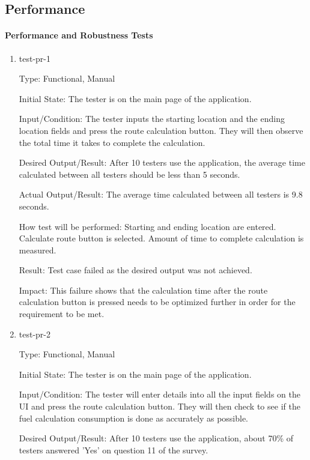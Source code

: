 \documentclass[12pt, titlepage]{article}
\begin{document}
\subsection{Performance}

\paragraph{Performance and Robustness Tests}

\begin{enumerate}

\item{test-pr-1\\}

Type: Functional, Manual

Initial State: The tester is on the main page of the application.

Input/Condition: The tester inputs the starting location and the ending location fields and press the route calculation button. They will then observe the total time it takes to complete the calculation.

Desired Output/Result: After 10 testers use the application, the average time calculated between all testers should be less than 5 seconds.

Actual Output/Result: The average time calculated between all testers is 9.8 seconds.

How test will be performed: Starting and ending location are entered. Calculate route button is selected. Amount of time to complete calculation is measured. 

Result: Test case failed as the desired output was not achieved.

Impact: This failure shows that the calculation time after the route calculation button is pressed needs to be optimized further in order for the requirement to be met.

\item{test-pr-2\\}

Type: Functional, Manual

Initial State: The tester is on the main page of the application.

Input/Condition: The tester will enter details into all the input fields on the UI and press the route calculation button. They will then check to see if the fuel calculation consumption is done as accurately as possible.

Desired Output/Result: After 10 testers use the application, about 70\% of testers answered 'Yes' on question 11 of the survey.


\end{enumerate}
\end{document}
